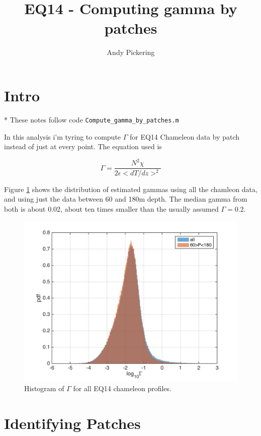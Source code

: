 \documentclass[11pt]{article}
\title{EQ14 - Computing gamma by patches}
\author{Andy Pickering}
\begin{document}
\maketitle

\tableofcontents
\newpage


\section{Intro}

* These notes follow code \verb+Compute_gamma_by_patches.m+

In this analysis i'm tyring to compute $\Gamma$ for EQ14 Chameleon data by patch instead of just at every point. The equation used is 

\begin{equation}
\Gamma=\frac{N^2 \chi}{2\epsilon <dT/dz>^2}
\end{equation}

Figure \ref{gam_cham} shows the distribution of estimated gammas using all the chamleon data, and using just the data between 60 and 180m depth. The median gamma from both is about 0.02, about ten times smaller than the usually assumed $\Gamma=0.2$.

\begin{figure}[htbp]
\includegraphics[scale=0.8]{gam_cham_hist.png}
\caption{Histogram of $\Gamma$ for all EQ14 chameleon profiles.}
\label{gam_cham}
\end{figure}


\section{Identifying Patches}
\end{document}

